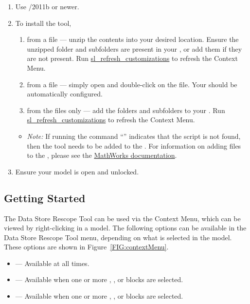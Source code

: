 \documentclass{article}
\makeatletter
\newcommand{\ToolName}{Data Store Rescope Tool\@\xspace}
\newcommand{\menu}[2]{%
	\ifthenelse{\equal{#1}{1}}{Rescope All}{}%
  	\ifthenelse{\equal{#1}{2}}{Rescope Selected}{}%
  	\ifthenelse{\equal{#1}{3}}{Rescope Non-Selected}{}%
}
\makeatother
\begin{document}
\begin{enumerate}
  \item Use \Matlab/\Simulink 2011b or newer.
	\item To install the tool,
	\begin{enumerate}
		\item from a  file --- unzip the contents into your desired location. Ensure the unzipped folder and subfolders are present in your \mpath, or add them if they are not present. Run \href{https://www.mathworks.com/help/simulink/ug/registering-customizations.html}{sl\_refresh\_customizations} to refresh the Context Menu. 
		\item from a  file --- simply open \Matlab and double-click on the file. Your \mpath should be automatically configured.
		\item from the files only --- add the folders and subfolders to your \mpath. Run \href{https://www.mathworks.com/help/simulink/ug/registering-customizations.html}{sl\_refresh\_customizations} to refresh the Context Menu.
	\end{enumerate}
	\begin{itemize}
		\item \textit{Note:} If running the command ``'' indicates that the script is not found, then the tool needs to be added to the \mpath.
		For information on adding files to the \mpath, please see the \href{https://www.mathworks.com/help/matlab/matlab_env/add-remove-or-reorder-folders-on-the-search-path.html}{MathWorks documentation}.
	\end{itemize}
	\item Ensure your model is open and unlocked.
\end{enumerate}

\subsection{Getting Started}
The \ToolName can be used via the \Simulink Context Menu, which can be viewed by right-clicking in a model. The following options can be available in the \ToolName menu, depending on what is selected in the model. These options are shown in Figure~\ref{FIG:contextMenu}.
\begin{itemize}
	\item \emph{} --- Available at all times.
	\item \emph{} --- Available when one or more \DSM, \DSR, or \DSW blocks are selected.
	\item \emph{} --- Available when one or more \DSM, \DSR, or \DSW blocks are selected.
\end{itemize}
\end{document}
